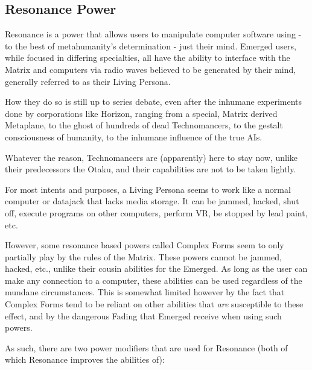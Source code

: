 
\begin{multicols*}{3}
	
	\subsection{Resonance Power}
	
	Resonance is a power that allows users to manipulate computer software using - to the best of metahumanity's determination - just their mind. Emerged users, while focused in differing specialties, all have the ability to interface with the Matrix and computers via radio waves believed to be generated by their mind, generally referred to as their Living Persona.
	
	How they do so is still up to series debate, even after the inhumane experiments done by corporations like Horizon, ranging from a special, Matrix derived Metaplane, to the ghost of hundreds of dead Technomancers, to the gestalt consciousness of humanity, to the inhumane influence of the true AIs.
	
	Whatever the reason, Technomancers are (apparently) here to stay now, unlike their predecessors the Otaku, and their capabilities are not to be taken lightly.
	
	For most intents and purposes, a Living Persona seems to work like a normal computer or datajack that lacks media storage. It can be jammed, hacked, shut off, execute programs on other computers, perform VR, be stopped by lead paint, etc. 
	
	However, some resonance based powers called Complex Forms seem to only partially play by the rules of the Matrix. These powers cannot be jammed, hacked, etc., unlike their cousin abilities for the Emerged. As long as the user can make any connection to a computer, these abilities can be used regardless of the mundane circumstances. This is somewhat limited however by the fact that Complex Forms tend to be reliant on other abilities that \textit{are} susceptible to these effect, and by the dangerous Fading that Emerged receive when using such powers.
	
	As such, there are two power modifiers that are used for Resonance (both of which Resonance improves the abilities of):
	

\end{multicols*}
